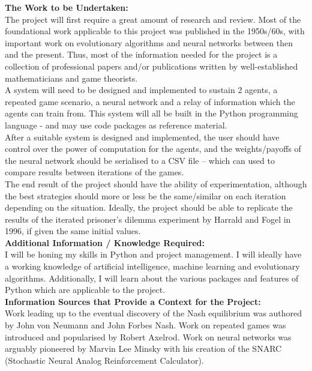\documentclass[12pt,a4paper]{article}
\begin{document}
\begin{appendices}
\textbf{The Work to be Undertaken:} \\
\newline
The project will first require a great amount of research and review. Most of the foundational work applicable to this project was published in the 1950s/60s, with important work on evolutionary algorithms and neural networks between then and the present. Thus, most of the information needed for the project is a collection of professional papers and/or publications written by well-established mathematicians and game theorists. \\
A system will need to be designed and implemented to sustain 2 agents, a repeated game scenario, a neural network and a relay of information which the agents can train from. This system will all be built in the Python programming language - and may use code packages as reference material. \\
After a suitable system is designed and implemented, the user should have control over the power of computation for the agents, and the weights/payoffs of the neural network should be serialised to a CSV file – which can used to compare results between iterations of the games. \\
The end result of the project should have the ability of experimentation, although the best strategies should more or less be the same/similar on each iteration depending on the situation. Ideally, the project should be able to replicate the results of the iterated prisoner’s dilemma experiment by Harrald and Fogel in 1996, if given the same initial values. \\

\textbf{Additional Information / Knowledge Required:} \\
\newline
I will be honing my skills in Python and project management. I will ideally have a working knowledge of artificial intelligence, machine learning and evolutionary algorithms. Additionally, I will learn about the various packages and features of Python which are applicable to the project. \\

\textbf{Information Sources that Provide a Context for the Project:} \\
\newline
Work leading up to the eventual discovery of the Nash equilibrium was authored by John von Neumann and John Forbes Nash. Work on repeated games was introduced and popularised by Robert Axelrod. Work on neural networks was arguably pioneered by Marvin Lee Minsky with his creation of the SNARC (Stochastic Neural Analog Reinforcement Calculator). \\


\end{appendices}
\end{document}
